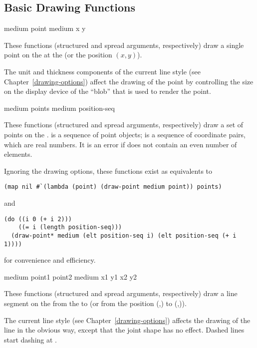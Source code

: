 \subsection {Basic Drawing Functions}

  {medium point \key \DrawingOptions \PointOptions}
 {medium x y   \key \DrawingOptions \PointOptions}

These functions (structured and spread arguments, respectively) draw a single
point on the   at the   (or the
position $(x,y)$).

The unit and thickness components of the current line style (see
Chapter~\ref{drawing-options}) affect the drawing of the point by controlling
the size on the display device of the ``blob'' that is used to render the point.


  {medium points \key \DrawingOptions \PointOptions}
 {medium position-seq \key \DrawingOptions \PointOptions}

These functions (structured and spread arguments, respectively) draw a set of
points on the  .   is a sequence of point
objects;  is a sequence of coordinate pairs, which are real
numbers.  It is an error if  does not contain an even number
of elements.

Ignoring the drawing options, these functions exist as equivalents to
\begin{verbatim}
(map nil #`(lambda (point) (draw-point medium point)) points)
\end{verbatim}
and
\begin{verbatim}
(do ((i 0 (+ i 2)))
    ((= i (length position-seq)))
  (draw-point* medium (elt position-seq i) (elt position-seq (+ i 1))))
\end{verbatim}
for convenience and efficiency.


  {medium point1 point2 \key \DrawingOptions \LineCapOptions}
 {medium x1 y1  x2 y2  \key \DrawingOptions \LineCapOptions}

These functions (structured and spread arguments, respectively) draw a line
segment on the   from the   to
 (or from the position (,) to (,)).

The current line style (see Chapter~\ref{drawing-options}) affects the drawing
of the line in the obvious way, except that the joint shape has no effect.
Dashed lines start dashing at .


